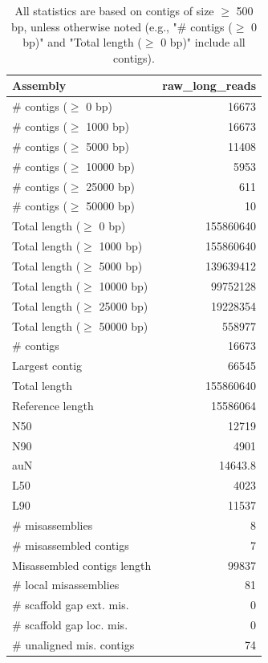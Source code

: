 \documentclass[12pt,a4paper]{article}
\begin{document}
\begin{table}[ht]
\begin{center}
\caption{All statistics are based on contigs of size $\geq$ 500 bp, unless otherwise noted (e.g., "\# contigs ($\geq$ 0 bp)" and "Total length ($\geq$ 0 bp)" include all contigs).}
\begin{tabular}{|l*{1}{|r}|}
\hline
Assembly & raw\_long\_reads \\ \hline
\# contigs ($\geq$ 0 bp) & 16673 \\ \hline
\# contigs ($\geq$ 1000 bp) & 16673 \\ \hline
\# contigs ($\geq$ 5000 bp) & 11408 \\ \hline
\# contigs ($\geq$ 10000 bp) & 5953 \\ \hline
\# contigs ($\geq$ 25000 bp) & 611 \\ \hline
\# contigs ($\geq$ 50000 bp) & 10 \\ \hline
Total length ($\geq$ 0 bp) & 155860640 \\ \hline
Total length ($\geq$ 1000 bp) & 155860640 \\ \hline
Total length ($\geq$ 5000 bp) & 139639412 \\ \hline
Total length ($\geq$ 10000 bp) & 99752128 \\ \hline
Total length ($\geq$ 25000 bp) & 19228354 \\ \hline
Total length ($\geq$ 50000 bp) & 558977 \\ \hline
\# contigs & 16673 \\ \hline
Largest contig & 66545 \\ \hline
Total length & 155860640 \\ \hline
Reference length & 15586064 \\ \hline
N50 & 12719 \\ \hline
N90 & 4901 \\ \hline
auN & 14643.8 \\ \hline
L50 & 4023 \\ \hline
L90 & 11537 \\ \hline
\# misassemblies & 8 \\ \hline
\# misassembled contigs & 7 \\ \hline
Misassembled contigs length & 99837 \\ \hline
\# local misassemblies & 81 \\ \hline
\# scaffold gap ext. mis. & 0 \\ \hline
\# scaffold gap loc. mis. & 0 \\ \hline
\# unaligned mis. contigs & 74 \\ \hline

\end{tabular}
\end{center}
\end{table}
\end{document}
